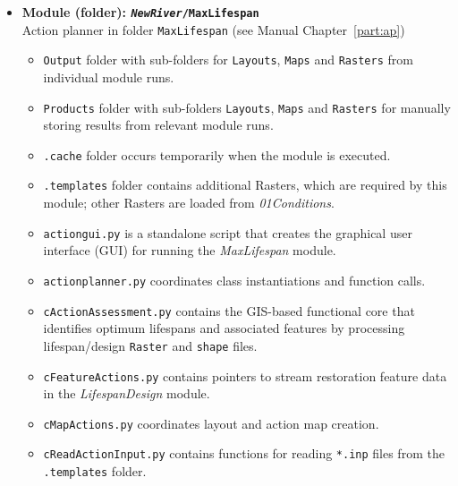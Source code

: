 \begin{itemize}
\begin{itemize}
		\item \texttt{feature{\myUnderscore}analysis.py} coordinates class instantiations and function calls.		
		\item \texttt{lifespan{\myUnderscore}design{\myUnderscore}gui.py} is a standalone script that creates the graphical user interface (GUI) for running the \textit{LifespanDesign} module.
		\item \texttt{LAUNCH{\myUnderscore}Windows{\myUnderscore}x64.bat} is a batchfile that runs \texttt{lifespan{\myUnderscore}design{\myUnderscore}gui.py}.
	\end{itemize}
	\item \textbf{Module (folder): \texttt{\textit{NewRiver}/MaxLifespan}}\\
	Action planner in folder \texttt{MaxLifespan} (see Manual Chapter~\ref{part:ap})
	\begin{itemize}
		\item \texttt{Output} folder with sub-folders for \texttt{Layouts}, \texttt{Maps} and \texttt{Rasters} from individual module runs.
		\item \texttt{Products} folder with sub-folders \texttt{Layouts}, \texttt{Maps} and \texttt{Rasters} for manually storing results from relevant module runs.
		\item \texttt{.cache} folder occurs temporarily when the module is executed.
		\item \texttt{.templates} folder contains additional Rasters, which are required by this module; other Rasters are loaded from \textit{01{\myUnderscore}Conditions}.
		\item \texttt{action{\myUnderscore}gui.py} is a standalone script that creates the graphical user interface (GUI) for running the \textit{MaxLifespan} module.
		\item \texttt{action{\myUnderscore}planner.py} coordinates class instantiations and function calls.
		\item \texttt{cActionAssessment.py} contains the GIS-based functional core that identifies optimum lifespans and associated features by processing lifespan/design \texttt{Raster} and \texttt{shape} files.
		\item \texttt{cFeatureActions.py} contains pointers to stream restoration feature data in the \textit{LifespanDesign} module.
		\item \texttt{cMapActions.py} coordinates layout and action map creation.
		\item \texttt{cReadActionInput.py} contains functions for reading \texttt{*.inp} files from the \texttt{.templates} folder.

\end{itemize}
\end{itemize}
